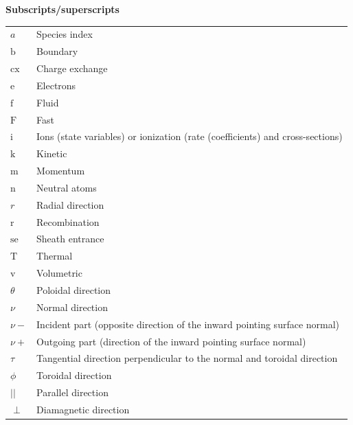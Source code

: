 \textbf{Subscripts/superscripts} \\
\begin{tabular}{L{2cm} L{12cm}}
	$a$ &  Species index \\
	$\mathrm{b}$ &  Boundary \\
	$\mathrm{cx}$ &  Charge exchange \\
	$\mathrm{e}$ &  Electrons \\
	$\mathrm{f}$ &  Fluid \\
	$\mathrm{F}$ &  Fast \\
	$\mathrm{i}$ &  Ions (state variables) or ionization (rate (coefficients) and cross-sections) \\
	$\mathrm{k}$ &  Kinetic \\
	$\mathrm{m}$ &  Momentum \\
	$\mathrm{n}$ &  Neutral atoms \\
	$r$ &  Radial direction \\
	$\mathrm{r}$ &  Recombination \\
	$\mathrm{se}$ &  Sheath entrance \\
	$\mathrm{T}$ &  Thermal \\
	$\mathrm{v}$ &  Volumetric \\
	$\theta$ &  Poloidal direction \\
	$\nu$ & Normal direction \\
	$\nu-$ & \hspace{0.22cm} Incident part (opposite direction of the inward pointing surface normal) \\
	$\nu+$ & \hspace{0.22cm} Outgoing part (direction of the inward pointing surface normal) \\
	$\tau$ & Tangential direction perpendicular to the normal and toroidal direction \\
	$\phi$ & Toroidal direction \\
	$||$ & Parallel direction \\
	$\perp$ & Diamagnetic direction
\end{tabular}

\cleardoublepage
